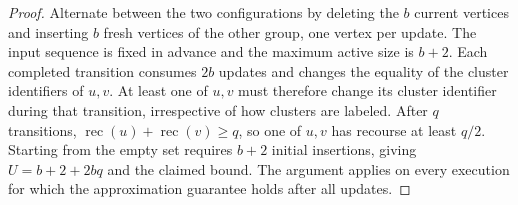 \documentclass[11pt]{article}
\begin{document}
\begin{proof}
Alternate between the two configurations by deleting the $b$ current
vertices and inserting $b$ fresh vertices of the other group, one
vertex per update. The input sequence is fixed in advance and the
maximum active size is $b+2$. Each completed transition consumes $2b$
updates and changes the equality of the cluster identifiers of $u,v$. At
least one of $u,v$ must therefore change its cluster identifier during that
transition, irrespective of how clusters are labeled. After $q$ transitions,
$\operatorname{rec}(u)+\operatorname{rec}(v)\ge q$, so one of $u,v$ has
recourse at least $q/2$. Starting from the empty set requires $b+2$
initial insertions, giving $U=b+2+2bq$ and the claimed bound. The
argument applies on every execution for which the approximation guarantee
holds after all updates.
\end{proof}
\end{document}
